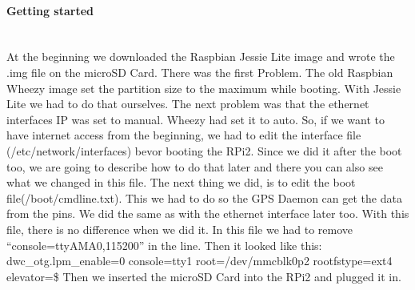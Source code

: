 \paragraph{Getting started} \mbox{}\\
At the beginning we downloaded the Raspbian Jessie Lite image and wrote the .img file on the microSD Card. \newline
There was the first Problem. \newline
The old Raspbian Wheezy image set the partition size to the maximum while booting. With Jessie Lite we had to do that ourselves. \newline
The next problem was that the ethernet interfaces IP was set to manual. Wheezy had set it to auto. So, if we want to have internet access from the beginning, we had to edit the interface file (/etc/network/interfaces) bevor booting the RPi2. Since we did it after the boot too, we are going to describe how to do that later and there you can also see what we changed in this file. \newline
The next thing we did, is to edit the boot file(/boot/cmdline.txt). This we had to do so the GPS Daemon can get the data from the pins. We did the same as with the ethernet interface later too. With this file, there is no difference when we did it. \newline
In this file we had to remove “console=ttyAMA0,115200” in the line. \newline
Then it looked like this: dwc\_otg.lpm\_enable=0 console=tty1 root=/dev/mmcblk0p2 rootfstype=ext4 elevator=\$ \newline
Then we inserted the microSD Card into the RPi2 and plugged it in.


